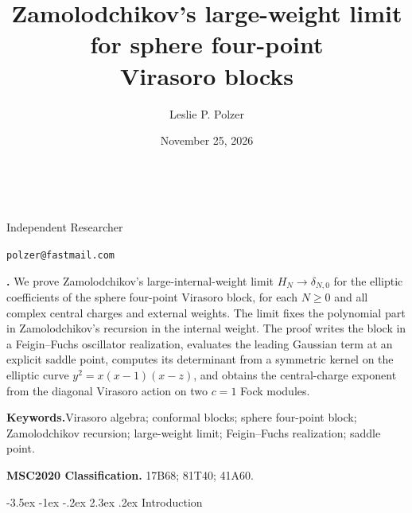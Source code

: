 \documentclass[twoside,10pt]{article}
\title{Zamolodchikov's large-weight limit for sphere four-point\\
Virasoro blocks}
\author{Leslie P. Polzer}
\date{November 25, 2026}
\makeatletter
\numberwithin{equation}{section}
\theoremstyle{slbody}
\theoremstyle{definition}
\theoremstyle{remark}
\newcommand{\authoraffiliation}{Independent Researcher}
\newcommand{\authoremail}{polzer@fastmail.com}
\renewcommand{\section}{%
  \@startsection{section}{1}{\z@}%
    {-3.5ex \@plus -1ex \@minus -.2ex}%
    {2.3ex \@plus .2ex}%
    {\normalfont\large\bfseries}}
\renewcommand{\maketitle}{%
  \begin{center}
    {\large\bfseries\@title}\\
    \vskip36pt
    \ifx\@author\@empty
      \mbox{}\par
    \else
      {\scshape\@author}\par
      \medskip
      {\small\authoraffiliation}\par
      \smallskip
      {\small\texttt{\authoremail}}\par
      \smallskip
      {\small\@date}\par
    \fi
    \vskip36pt
  \end{center}}
\renewenvironment{abstract}
  {\quotation\noindent\small{\bfseries\abstractname.\enspace}}
  {\endquotation}
\makeatother
\begin{document}
\maketitle

\begin{abstract}
We prove Zamolodchikov's large-internal-weight limit \(H_N\to\delta_{N,0}\)
for the elliptic coefficients of the sphere four-point Virasoro block, for
each \(N\geq0\) and all complex central charges and external weights.  The
limit fixes the polynomial part in Zamolodchikov's recursion in the internal
weight.  The proof writes the block in a Feigin--Fuchs oscillator
realization, evaluates the leading Gaussian term at an explicit saddle point,
computes its determinant from a symmetric kernel on the elliptic curve
\(y^2=x(x-1)(x-z)\), and obtains the central-charge exponent from the
diagonal Virasoro action on two \(c=1\) Fock modules.

\vskip5pt
\noindent\textbf{Keywords.}\enspace Virasoro algebra; conformal blocks;
sphere four-point block; Zamolodchikov recursion; large-weight limit;
Feigin--Fuchs realization; saddle point.

\vskip5pt
\noindent\textbf{MSC2020 Classification.}\enspace
17B68; 81T40; 41A60.
\end{abstract}

\section{Introduction}\label{sec:intro}
\end{document}
